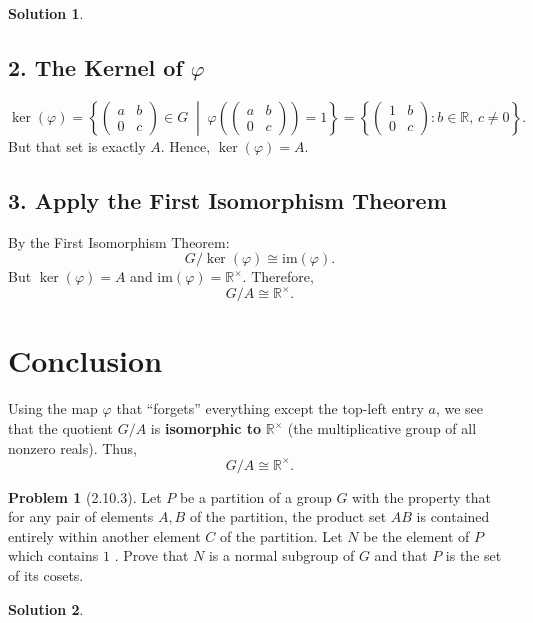 \documentclass[12pt]{article}
\theoremstyle{definition} %
\newtheorem{solution}{Solution}
\newtheorem{problem}{Problem}
\theoremstyle{plain} %
\begin{document}
\begin{solution}
\subsection*{2. The Kernel of \( \varphi \)}

\[
\ker(\varphi)
= \left\{
\begin{pmatrix}
a & b \\
0 & c
\end{pmatrix}
\in G
\;\middle|\;
\varphi\left(\begin{pmatrix}
a & b \\
0 & c
\end{pmatrix}\right) = 1
\right\}
= \left\{
\begin{pmatrix}
1 & b \\
0 & c
\end{pmatrix}
: b \in \mathbb{R},\, c \neq 0
\right\}.
\]
But that set is exactly \( A \). Hence, \( \ker(\varphi) = A \).

\subsection*{3. Apply the First Isomorphism Theorem}

By the First Isomorphism Theorem:
\[
G / \ker(\varphi)
\cong
\mathrm{im}(\varphi).
\]
But \( \ker(\varphi) = A \) and \( \mathrm{im}(\varphi) = \mathbb{R}^\times \).  
Therefore,
\[
G / A \cong \mathbb{R}^\times.
\]

\section*{Conclusion}

Using the map \( \varphi \) that “forgets” everything except the top-left entry \( a \), we see that the quotient \( G / A \) is \textbf{isomorphic to} \( \mathbb{R}^\times \) (the multiplicative group of all nonzero reals). Thus,
\[
\boxed{G / A \cong \mathbb{R}^\times.}
\]
\end{solution}
\begin{problem}[2.10.3]
   Let $P$ be a partition of a group $G$ with the property that for any pair of elements $A,B$ of the partition, the product set $AB$ is contained entirely within another element $C$ of the partition. Let $N$ be the element of $P$ which contains $1$ . Prove that $N$ is a normal subgroup of $G$ and that $P$ is the set of its cosets. 
\end{problem}
\begin{solution}
    
\end{solution}
\end{document}
